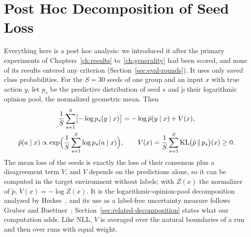 \chapter{Post Hoc Decomposition of Seed Loss}
\label{ch:decomposition}

Everything here is a post hoc analysis: we introduced it after the primary
experiments of Chapters~\ref{ch:results} to~\ref{ch:generality} had
been scored, and none of its results entered any criterion
(Section~\ref{sec:eval-rounds}). It uses only saved class
probabilities. For the $S=30$ seeds of one group and an input
$x$ with true action $y$, let $p_s$ be the predictive distribution of
seed $s$ and $\tilde p$ their logarithmic opinion pool, the normalized
geometric mean. Then
\begin{equation}
  \begin{gathered}
  \frac{1}{S}\sum_{s=1}^{S}\bigl[-\log p_s(y\mid x)\bigr]
  = -\log \tilde p(y\mid x) + V(x),\\
  \tilde p(a\mid x)\propto
  \exp\Bigl(\frac{1}{S}\sum_{s=1}^{S}\log p_s(a\mid x)\Bigr),
  \qquad
  V(x)=\frac{1}{S}\sum_{s=1}^{S}\mathrm{KL}\bigl(\tilde p\,\|\,p_s\bigr)(x)
  \ge 0 .
  \end{gathered}
  \label{eq:decomposition}
\end{equation}
The mean loss of the seeds is exactly the loss of their consensus plus a
disagreement term $V$, and $V$ depends on the predictions alone, so it
can be computed in the target environment without labels; with
$Z(x)$ the normalizer of $\tilde p$, $V(x)=-\log Z(x)$.
It is the logarithmic-opinion-pool decomposition analyzed by
Heskes~\cite{heskes1997selecting}, and its use as a label-free
uncertainty measure follows Gruber and
Buettner~\cite{gruber2022uncertainty}; Section~\ref{sec:related-decomposition}
states what our computation adds.
Like NLL, $V$ is averaged over
the natural boundaries of a run and then over runs with equal weight.

